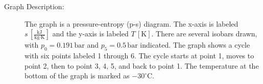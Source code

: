 

\item[a)] 
        \begin{description}
            \item[Graph Description:] The graph is a pressure-entropy (p-s) diagram. The x-axis is labeled $s \, [\frac{\text{kJ}}{\text{kg} \cdot \text{K}}]$ and the y-axis is labeled $T \, [\text{K}]$. There are several isobars drawn, with $p_0 = 0.191 \, \text{bar}$ and $p_5 = 0.5 \, \text{bar}$ indicated. The graph shows a cycle with six points labeled 1 through 6. The cycle starts at point 1, moves to point 2, then to point 3, 4, 5, and back to point 1. The temperature at the bottom of the graph is marked as $-30^\circ \text{C}$.
        \end{description}